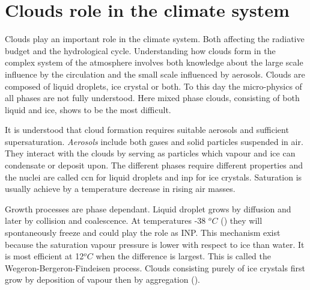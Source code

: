 \section{Clouds role in the climate system} \label{sec:cloud_in_climate_system}
Clouds play an important role in the climate system. Both affecting the radiative budget and the hydrological cycle. Understanding how clouds form in the complex system of the atmosphere involves both knowledge about the large scale influence by the circulation and the small scale influenced by aerosols. Clouds are composed of liquid droplets, ice crystal or both. To this day the micro-physics of all phases are not fully understood. Here mixed phase clouds, consisting of both liquid and ice, shows to be the most difficult. 

It is understood that cloud formation requires suitable aerosols and sufficient supersaturation. \textit{Aerosols} include both gases and solid particles suspended in air. They interact with the clouds by serving as particles which vapour and ice can condensate or deposit upon. The different phases require different properties and the nuclei are called \acrshort{ccn} for liquid droplets and \acrshort{inp} for ice crystals. Saturation is usually achieve by a temperature decrease in rising air masses. %
 
Growth processes are phase dependant. Liquid droplet grows by diffusion and later by collision and coalescence. At temperatures -38 $^oC$ (\cite{lohmann2016}) they will spontaneously freeze and could play the role as INP. 
This mechanism exist because the saturation vapour pressure is lower with respect to ice than water. It is most efficient at 12$^oC$ when the difference is largest. This is called the Wegeron-Bergeron-Findeisen process. Clouds consisting purely of ice crystals first grow by deposition of vapour then by aggregation (\cite{Fowler1996LiquidAssumptions}). 


